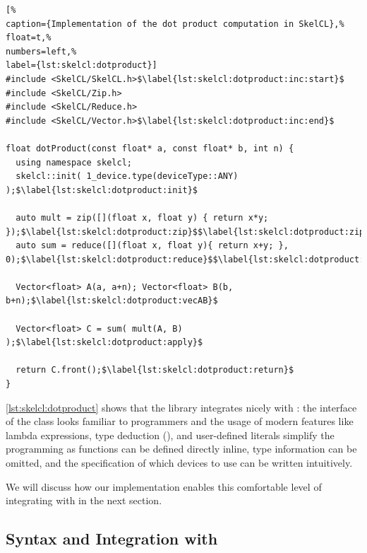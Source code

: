 \begin{lstlisting}[%                                                             
caption={Implementation of the dot product computation in SkelCL},%
float=t,%
numbers=left,%
label={lst:skelcl:dotproduct}]
#include <SkelCL/SkelCL.h>$\label{lst:skelcl:dotproduct:inc:start}$
#include <SkelCL/Zip.h>
#include <SkelCL/Reduce.h>
#include <SkelCL/Vector.h>$\label{lst:skelcl:dotproduct:inc:end}$

float dotProduct(const float* a, const float* b, int n) {
  using namespace skelcl;
  skelcl::init( 1_device.type(deviceType::ANY) );$\label{lst:skelcl:dotproduct:init}$

  auto mult = zip([](float x, float y) { return x*y; });$\label{lst:skelcl:dotproduct:zip}$$\label{lst:skelcl:dotproduct:zip:lambda}$
  auto sum = reduce([](float x, float y){ return x+y; }, 0);$\label{lst:skelcl:dotproduct:reduce}$$\label{lst:skelcl:dotproduct:reduce:lambda}$

  Vector<float> A(a, a+n); Vector<float> B(b, b+n);$\label{lst:skelcl:dotproduct:vecAB}$

  Vector<float> C = sum( mult(A, B) );$\label{lst:skelcl:dotproduct:apply}$

  return C.front();$\label{lst:skelcl:dotproduct:return}$
}
\end{lstlisting}

\autoref{lst:skelcl:dotproduct} shows that the \SkelCL library integrates nicely with \Cpp:
the interface of the  class looks familiar to \Cpp programmers and the usage of modern \Cpp features like lambda expressions, type deduction (), and user-defined literals simplify the programming as functions can be defined directly inline, type information can be omitted, and the specification of which devices to use can be written intuitively.

We will discuss how our implementation enables this comfortable level of integrating \SkelCL with \Cpp in the next section.










\subsection{Syntax and Integration with \Cpp}
\label{section:skelcl-library:syntax}

